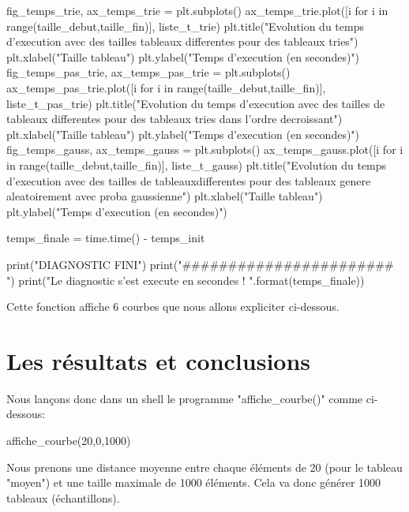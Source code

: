 \documentclass[a4paper,12pt]{article}
\begin{document}
\begin{python}
    fig_temps_trie, ax_temps_trie = plt.subplots()
    ax_temps_trie.plot([i for i in range(taille_debut,taille_fin)], liste_t_trie)
    plt.title("Evolution du temps d'execution avec des tailles \nde tableaux differentes pour des tableaux tries")
    plt.xlabel("Taille tableau")
    plt.ylabel("Temps d'execution (en secondes)")
    fig_temps_pas_trie, ax_temps_pas_trie = plt.subplots()
    ax_temps_pas_trie.plot([i for i in range(taille_debut,taille_fin)], liste_t_pas_trie)
    plt.title("Evolution du temps d'execution avec des tailles de tableaux \n differentes pour des tableaux tries dans l'ordre decroissant")
    plt.xlabel("Taille tableau")
    plt.ylabel("Temps d'execution (en secondes)")
    fig_temps_gauss, ax_temps_gauss = plt.subplots()
    ax_temps_gauss.plot([i for i in range(taille_debut,taille_fin)], liste_t_gauss)
    plt.title("Evolution du temps d'execution avec des tailles de tableaux\n differentes pour des tableaux genere aleatoirement avec proba gaussienne")
    plt.xlabel("Taille tableau")
    plt.ylabel("Temps d'execution (en secondes)")
    
    temps_finale = time.time() - temps_init
    
    print("DIAGNOSTIC FINI")
    print("####################### \n")
    print("Le diagnostic s'est execute en {} secondes ! ".format(temps_finale))
\end{python}
Cette fonction affiche 6 courbes que nous allons expliciter ci-dessous.
\section{Les résultats et conclusions} 
Nous lançons donc dans un shell le programme "affiche\_courbe()" comme ci-dessous:
\begin{python}
  affiche_courbe(20,0,1000)
\end{python}
Nous prenons une distance moyenne entre chaque éléments de 20 (pour le tableau "moyen") et une taille maximale de 1000 éléments. Cela va donc générer 1000 tableaux (échantillons).
\end{document}
